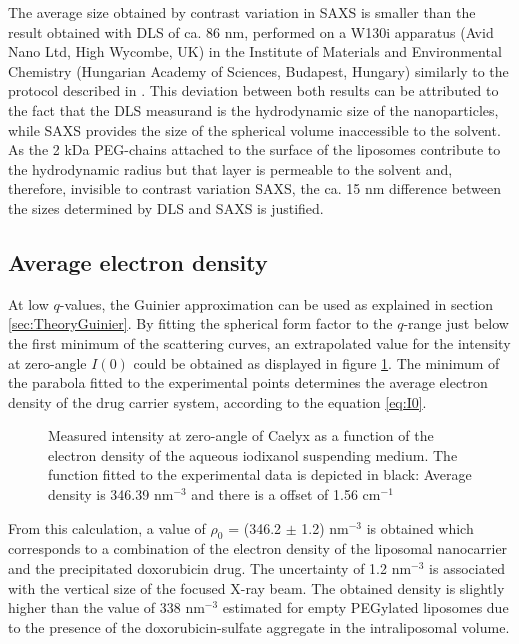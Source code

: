 The average size obtained by contrast variation in SAXS is smaller than the result obtained with DLS of ca. 86 nm, performed on a W130i apparatus (Avid Nano Ltd, High Wycombe, UK) in the Institute of Materials and Environmental Chemistry (Hungarian Academy of Sciences, Budapest, Hungary) similarly to the protocol described in \cite{varga_osmotic_2014}. This deviation between both results can be attributed to the fact that the DLS measurand is the hydrodynamic size of the nanoparticles, while SAXS provides the size of the spherical volume inaccessible to the solvent. As the 2 kDa PEG-chains attached to the surface of the liposomes contribute to the hydrodynamic radius but that layer is permeable to the solvent and, therefore, invisible to contrast variation SAXS, the ca. 15 nm difference between the sizes determined by DLS and SAXS is justified. 

\subsection{Average electron density}
At low $q$-values, the Guinier approximation can be used as explained in section \ref{sec:TheoryGuinier}. By fitting the spherical form factor to the $q$-range just below the first minimum of the scattering curves, an extrapolated value for the intensity at zero-angle $I(0)$ could be obtained as displayed in figure \ref{fig:CaelyxAverageDensity}. The minimum of the parabola fitted to the experimental points determines the average electron density of the drug carrier system, according to the equation \ref{eq:I0}.

\begin{figure}
	\centering
		
		\caption[Zero-angle intensity of Caelyx.]{Measured intensity at zero-angle of Caelyx as a function of the electron density of the aqueous iodixanol suspending medium. The function fitted to the experimental data is depicted in black: Average density is 346.39 nm$^{-3}$ and there is a offset of 1.56 cm$^{-1}$}
		\label{fig:CaelyxAverageDensity}
\end{figure}

From this calculation, a value of $\rho_0$ = (346.2 $\pm$ 1.2) nm$^{-3}$ is obtained which corresponds to a combination of the electron density of the liposomal nanocarrier and the precipitated doxorubicin drug. The uncertainty of 1.2 nm$^{-3}$ is associated with the vertical size of the focused X-ray beam. The obtained density is slightly higher than the value of 338 nm$^{-3}$ estimated for empty PEGylated liposomes \citep{kucerka_structure_2006} due to the presence of the doxorubicin-sulfate aggregate in the intraliposomal volume.


